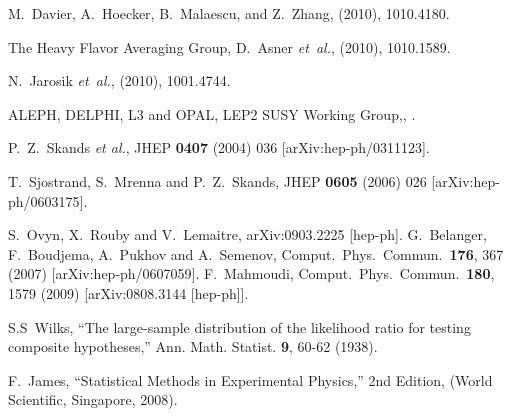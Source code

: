 \begin{thebibliography}{10}
M.~Davier, A.~Hoecker, B.~Malaescu, and Z.~Zhang,
\newblock (2010), 1010.4180.

The Heavy Flavor Averaging Group, D.~Asner {\em et~al.},
\newblock (2010), 1010.1589.

N.~Jarosik {\em et~al.},
\newblock (2010), 1001.4744.

ALEPH, DELPHI, L3 and OPAL, {LEP2 SUSY Working Group,},
.

  P.~Z.~Skands {\it et al.},
  JHEP {\bf 0407} (2004) 036
  [arXiv:hep-ph/0311123].

  T.~Sjostrand, S.~Mrenna and P.~Z.~Skands,
  JHEP {\bf 0605} (2006) 026
  [arXiv:hep-ph/0603175].

  S.~Ovyn, X.~Rouby and V.~Lemaitre,
  arXiv:0903.2225 [hep-ph].
%
  G.~Belanger, F.~Boudjema, A.~Pukhov and A.~Semenov,
  Comput.\ Phys.\ Commun.\  {\bf 176}, 367 (2007)
  [arXiv:hep-ph/0607059].
%
  F.~Mahmoudi,
  Comput.\ Phys.\ Commun.\  {\bf 180}, 1579 (2009)
  [arXiv:0808.3144 [hep-ph]].
%

S.S~Wilks, ``The large-sample distribution of the likelihood ratio for testing composite hypotheses,'' Ann. Math. Statist. {\bf 9}, 60-62 (1938).
	
F.~James, ``Statistical Methods in Experimental Physics,''  2nd Edition, (World Scientific, Singapore, 2008).
	



\end{thebibliography}
